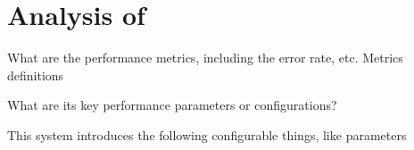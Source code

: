 \section{Analysis of }
\label{analysis}

What are the performance metrics, including the error rate, etc. Metrics definitions

What are its key performance parameters or configurations?

This system introduces the following configurable things, like parameters
 
